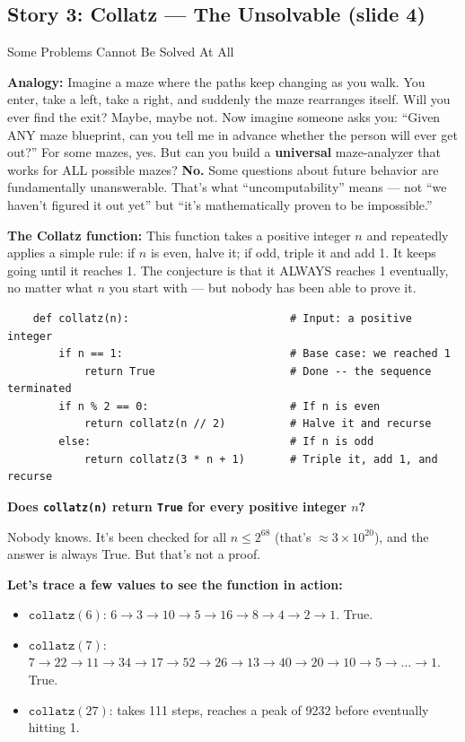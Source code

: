 \documentclass[11pt,a4paper]{article}
\begin{document}
\subsection{Story 3: Collatz --- The Unsolvable (slide 4)}

\begin{conceptbox}{Some Problems Cannot Be Solved At All}

\textbf{Analogy:} Imagine a maze where the paths keep changing as you walk. You enter, take a left, take a right, and suddenly the maze rearranges itself. Will you ever find the exit? Maybe, maybe not. Now imagine someone asks you: ``Given ANY maze blueprint, can you tell me in advance whether the person will ever get out?'' For some mazes, yes. But can you build a \textbf{universal} maze-analyzer that works for ALL possible mazes? \textbf{No.} Some questions about future behavior are fundamentally unanswerable. That's what ``uncomputability'' means --- not ``we haven't figured it out yet'' but ``it's mathematically proven to be impossible.''

\textbf{The Collatz function:} This function takes a positive integer $n$ and repeatedly applies a simple rule: if $n$ is even, halve it; if odd, triple it and add 1. It keeps going until it reaches 1. The conjecture is that it ALWAYS reaches 1 eventually, no matter what $n$ you start with --- but nobody has been able to prove it.

\begin{lstlisting}
    def collatz(n):                         # Input: a positive integer
        if n == 1:                          # Base case: we reached 1
            return True                     # Done -- the sequence terminated
        if n % 2 == 0:                      # If n is even
            return collatz(n // 2)          # Halve it and recurse
        else:                               # If n is odd
            return collatz(3 * n + 1)       # Triple it, add 1, and recurse
\end{lstlisting}

\textbf{Does \texttt{collatz(n)} return \texttt{True} for every positive integer $n$?}

Nobody knows. It's been checked for all $n \leq 2^{68}$ (that's $\approx 3 \times 10^{20}$), and the answer is always True. But that's not a proof.

\textbf{Let's trace a few values to see the function in action:}
\begin{itemize}[nosep]
\item $\texttt{collatz}(6)$: $6 \to 3 \to 10 \to 5 \to 16 \to 8 \to 4 \to 2 \to 1$. True.
\item $\texttt{collatz}(7)$: $7 \to 22 \to 11 \to 34 \to 17 \to 52 \to 26 \to 13 \to 40 \to 20 \to 10 \to 5 \to \ldots \to 1$. True.
\item $\texttt{collatz}(27)$: takes 111 steps, reaches a peak of 9232 before eventually hitting 1.
\end{itemize}


\end{conceptbox}
\end{document}
